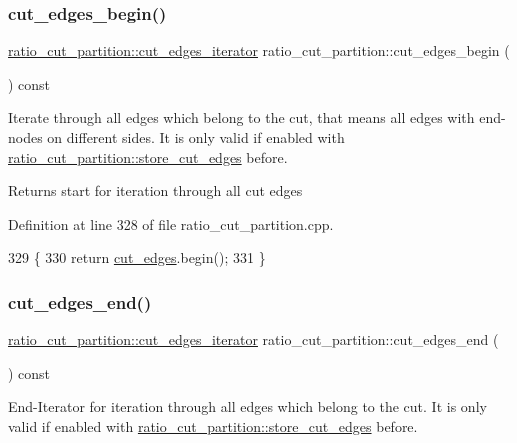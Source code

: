 \subsubsection{\texorpdfstring{cut\+\_\+edges\+\_\+begin()}{cut\_edges\_begin()}}
{\footnotesize\ttfamily \mbox{\hyperlink{classratio__cut__partition_a910bb0e5c927ffd26a3805787e179194}{ratio\+\_\+cut\+\_\+partition\+::cut\+\_\+edges\+\_\+iterator}} ratio\+\_\+cut\+\_\+partition\+::cut\+\_\+edges\+\_\+begin (\begin{DoxyParamCaption}{ }\end{DoxyParamCaption}) const}

Iterate through all edges which belong to the cut, that means all edges with end-\/nodes on different sides. It is only valid if enabled with \mbox{\hyperlink{classratio__cut__partition_af5a76fa0ecaf2c75792cc2c1574994c7}{ratio\+\_\+cut\+\_\+partition\+::store\+\_\+cut\+\_\+edges}} before.

\begin{DoxyReturn}{Returns}
start for iteration through all cut edges 
\end{DoxyReturn}


Definition at line 328 of file ratio\+\_\+cut\+\_\+partition.\+cpp.


\begin{DoxyCode}
329 \{
330     \textcolor{keywordflow}{return} \mbox{\hyperlink{classratio__cut__partition_a5ab55eef04a72c0be731d848cb9a5d50}{cut\_edges}}.begin();
331 \}
\end{DoxyCode}
\mbox{\label{classratio__cut__partition_a8609d76a4d74cb3b2596ac370c839fce}} 
\subsubsection{\texorpdfstring{cut\+\_\+edges\+\_\+end()}{cut\_edges\_end()}}
{\footnotesize\ttfamily \mbox{\hyperlink{classratio__cut__partition_a910bb0e5c927ffd26a3805787e179194}{ratio\+\_\+cut\+\_\+partition\+::cut\+\_\+edges\+\_\+iterator}} ratio\+\_\+cut\+\_\+partition\+::cut\+\_\+edges\+\_\+end (\begin{DoxyParamCaption}{ }\end{DoxyParamCaption}) const}

End-\/\+Iterator for iteration through all edges which belong to the cut. It is only valid if enabled with \mbox{\hyperlink{classratio__cut__partition_af5a76fa0ecaf2c75792cc2c1574994c7}{ratio\+\_\+cut\+\_\+partition\+::store\+\_\+cut\+\_\+edges}} before.

